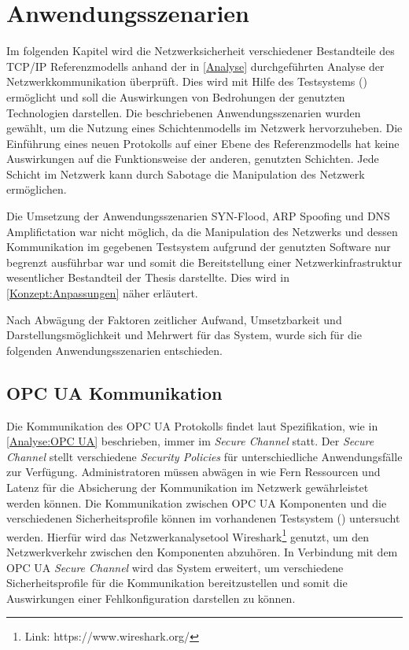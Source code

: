 \chapter{Anwendungsszenarien}
\label{Anwendungsszenarien}
Im folgenden Kapitel wird die Netzwerksicherheit verschiedener Bestandteile des \ac{TCP}/\ac{IP} Referenzmodells anhand der in \autoref{Analyse} durchgeführten Analyse der Netzwerkkommunikation überprüft. Dies wird mit Hilfe des Testsystems (\cite{Weber2018}) ermöglicht und soll die Auswirkungen von Bedrohungen der genutzten Technologien darstellen. Die beschriebenen Anwendungsszenarien wurden gewählt, um die Nutzung eines Schichtenmodells im Netzwerk hervorzuheben. Die Einführung eines neuen Protokolls auf einer Ebene des Referenzmodells hat keine Auswirkungen auf die Funktionsweise der anderen, genutzten Schichten. Jede Schicht im Netzwerk kann durch Sabotage die Manipulation des Netzwerk ermöglichen.

Die Umsetzung der Anwendungsszenarien SYN-Flood, \ac{ARP} Spoofing und \ac{DNS} Amplifictation war nicht möglich, da die Manipulation des Netzwerks und dessen Kommunikation im gegebenen Testsystem aufgrund der genutzten Software nur begrenzt ausführbar war und somit die Bereitstellung einer Netzwerkinfrastruktur wesentlicher Bestandteil der Thesis darstellte. Dies wird in \autoref{Konzept:Anpassungen} näher erläutert.

Nach Abwägung der Faktoren zeitlicher Aufwand, Umsetzbarkeit und Darstellungsmöglichkeit und Mehrwert für das System, wurde sich für die folgenden Anwendungsszenarien entschieden.

\section{\ac{OPC UA} Kommunikation}
\label{Anwendungsszenarien:OPC UA Kommunikation}
Die Kommunikation des \ac{OPC UA} Protokolls findet laut Spezifikation, wie in \autoref{Analyse:OPC UA} beschrieben, immer im \textit{Secure Channel} statt. Der \textit{Secure Channel} stellt verschiedene \textit{Security Policies} für unterschiedliche Anwendungsfälle zur Verfügung. Administratoren müssen abwägen in wie Fern Ressourcen und Latenz für die Absicherung der Kommunikation im Netzwerk gewährleistet werden können. Die Kommunikation zwischen \ac{OPC UA} Komponenten und die verschiedenen Sicherheitsprofile können im vorhandenen Testsystem (\cite{Weber2018}) untersucht werden. Hierfür wird das Netzwerkanalysetool Wireshark\footnote{Link: https://www.wireshark.org/} genutzt, um den Netzwerkverkehr zwischen den Komponenten abzuhören. In Verbindung mit dem \ac{OPC UA} \textit{Secure Channel} wird das System erweitert, um verschiedene Sicherheitsprofile für die Kommunikation bereitzustellen und somit die Auswirkungen einer Fehlkonfiguration darstellen zu können.


